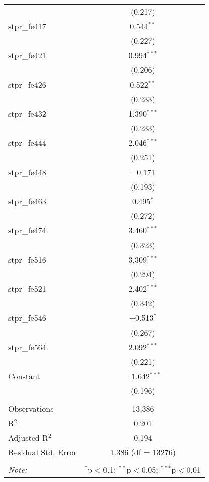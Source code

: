 \begin{table}[!htbp]
\begin{tabular}{@{\extracolsep{5pt}}lc}
  & (0.217) \\ 
  stpr\_fe417 & 0.544$^{**}$ \\ 
  & (0.227) \\ 
  stpr\_fe421 & 0.994$^{***}$ \\ 
  & (0.206) \\ 
  stpr\_fe426 & 0.522$^{**}$ \\ 
  & (0.233) \\ 
  stpr\_fe432 & 1.390$^{***}$ \\ 
  & (0.233) \\ 
  stpr\_fe444 & 2.046$^{***}$ \\ 
  & (0.251) \\ 
  stpr\_fe448 & $-$0.171 \\ 
  & (0.193) \\ 
  stpr\_fe463 & 0.495$^{*}$ \\ 
  & (0.272) \\ 
  stpr\_fe474 & 3.460$^{***}$ \\ 
  & (0.323) \\ 
  stpr\_fe516 & 3.309$^{***}$ \\ 
  & (0.294) \\ 
  stpr\_fe521 & 2.402$^{***}$ \\ 
  & (0.342) \\ 
  stpr\_fe546 & $-$0.513$^{*}$ \\ 
  & (0.267) \\ 
  stpr\_fe564 & 2.092$^{***}$ \\ 
  & (0.221) \\ 
  Constant & $-$1.642$^{***}$ \\ 
  & (0.196) \\ 
 \hline \\[-1.8ex] 
Observations & 13,386 \\ 
R$^{2}$ & 0.201 \\ 
Adjusted R$^{2}$ & 0.194 \\ 
Residual Std. Error & 1.386 (df = 13276) \\ 
\hline 
\hline \\[-1.8ex] 
\textit{Note:}  & \multicolumn{1}{r}{$^{*}$p$<$0.1; $^{**}$p$<$0.05; $^{***}$p$<$0.01} \\ 
\end{tabular} 
\end{table} 

